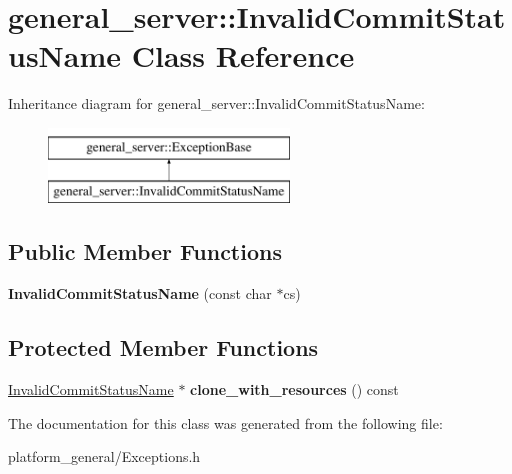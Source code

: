 \hypertarget{classgeneral__server_1_1InvalidCommitStatusName}{\section{general\-\_\-server\-:\-:\-Invalid\-Commit\-Status\-Name \-Class \-Reference}
\label{classgeneral__server_1_1InvalidCommitStatusName}
}
\-Inheritance diagram for general\-\_\-server\-:\-:\-Invalid\-Commit\-Status\-Name\-:\begin{figure}[H]
\begin{center}
\leavevmode
\includegraphics[height=2.000000cm]{classgeneral__server_1_1InvalidCommitStatusName}
\end{center}
\end{figure}
\subsection*{\-Public \-Member \-Functions}
\begin{DoxyCompactItemize}
\item 
\hypertarget{classgeneral__server_1_1InvalidCommitStatusName_a020a2bcc34e981a24c9583798e5bc7e2}{{\bfseries \-Invalid\-Commit\-Status\-Name} (const char $\ast$cs)}\label{classgeneral__server_1_1InvalidCommitStatusName_a020a2bcc34e981a24c9583798e5bc7e2}

\end{DoxyCompactItemize}
\subsection*{\-Protected \-Member \-Functions}
\begin{DoxyCompactItemize}
\item 
\hypertarget{classgeneral__server_1_1InvalidCommitStatusName_a2207ebe2c9992a94dae743910c936167}{\hyperlink{classgeneral__server_1_1InvalidCommitStatusName}{\-Invalid\-Commit\-Status\-Name} $\ast$ {\bfseries clone\-\_\-with\-\_\-resources} () const }\label{classgeneral__server_1_1InvalidCommitStatusName_a2207ebe2c9992a94dae743910c936167}

\end{DoxyCompactItemize}


\-The documentation for this class was generated from the following file\-:\begin{DoxyCompactItemize}
\item 
platform\-\_\-general/\-Exceptions.\-h\end{DoxyCompactItemize}
